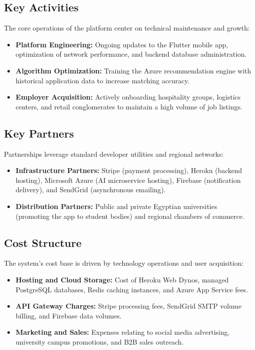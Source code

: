 \documentclass[12pt, a4paper]{report}
\begin{document}
\subsection{Key Activities}
The core operations of the platform center on technical maintenance and growth:
\begin{itemize}
    \item \textbf{Platform Engineering:} Ongoing updates to the Flutter mobile app, optimization of network performance, and backend database administration.
    \item \textbf{Algorithm Optimization:} Training the Azure recommendation engine with historical application data to increase matching accuracy.
    \item \textbf{Employer Acquisition:} Actively onboarding hospitality groups, logistics centers, and retail conglomerates to maintain a high volume of job listings.
\end{itemize}

\subsection{Key Partners}
Partnerships leverage standard developer utilities and regional networks:
\begin{itemize}
    \item \textbf{Infrastructure Partners:} Stripe (payment processing), Heroku (backend hosting), Microsoft Azure (AI microservice hosting), Firebase (notification delivery), and SendGrid (asynchronous emailing).
    \item \textbf{Distribution Partners:} Public and private Egyptian universities (promoting the app to student bodies) and regional chambers of commerce.
\end{itemize}

\subsection{Cost Structure}
The system's cost base is driven by technology operations and user acquisition:
\begin{itemize}
    \item \textbf{Hosting and Cloud Storage:} Cost of Heroku Web Dynos, managed PostgreSQL databases, Redis caching instances, and Azure App Service fees.
    \item \textbf{API Gateway Charges:} Stripe processing fees, SendGrid SMTP volume billing, and Firebase data volumes.
    \item \textbf{Marketing and Sales:} Expenses relating to social media advertising, university campus promotions, and B2B sales outreach.
\end{itemize}
\end{document}
